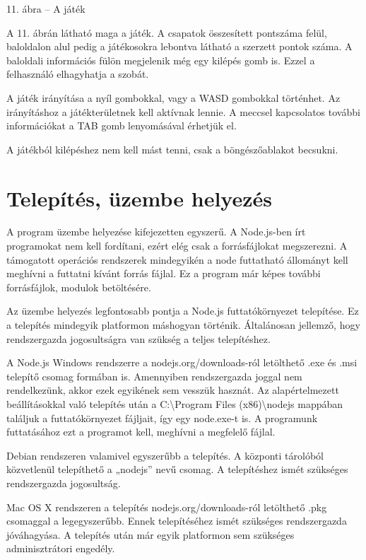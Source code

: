 \documentclass[]{article}
\begin{document}
11. ábra -- A játék

A 11. ábrán látható maga a játék. A csapatok összesített pontszáma
felül, baloldalon alul pedig a játékosokra lebontva látható a szerzett
pontok száma. A baloldali információs fülön megjelenik még egy kilépés
gomb is. Ezzel a felhasználó elhagyhatja a szobát.

A játék irányítása a nyíl gombokkal, vagy a WASD gombokkal történhet. Az
irányításhoz a játékterületnek kell aktívnak lennie. A meccsel
kapcsolatos további információkat a TAB gomb lenyomásával érhetjük el.

A játékból kilépéshez nem kell mást tenni, csak a böngészőablakot
becsukni.

\hypertarget{telepuxedtuxe9s-uxfczembe-helyezuxe9s}{%
\section{Telepítés, üzembe
helyezés}\label{telepuxedtuxe9s-uxfczembe-helyezuxe9s}}

A program üzembe helyezése kifejezetten egyszerű. A Node.js-ben írt
programokat nem kell fordítani, ezért elég csak a forrásfájlokat
megszerezni. A támogatott operációs rendszerek mindegyikén a node
futtatható állományt kell meghívni a futtatni kívánt forrás fájlal. Ez a
program már képes további forrásfájlok, modulok betöltésére.

Az üzembe helyezés legfontosabb pontja a Node.js futtatókörnyezet
telepítése. Ez a telepítés mindegyik platformon máshogyan történik.
Általánosan jellemző, hogy rendszergazda jogosultságra van szükség a
teljes telepítéshez.

A Node.js Windows rendszerre a nodejs.org/downloads-ról letölthető .exe
és .msi telepítő csomag formában is. Amennyiben rendszergazda joggal nem
rendelkezünk, akkor ezek egyikének sem vesszük hasznát. Az
alapértelmezett beállításokkal való telepítés után a
C:\textbackslash{}Program Files (x86)\textbackslash{}nodejs mappában
találjuk a futtatókörnyezet fájljait, így egy node.exe-t is. A
programunk futtatásához ezt a programot kell, meghívni a megfelelő
fájlal.

Debian rendszeren valamivel egyszerűbb a telepítés. A központi tárolóból
közvetlenül telepíthető a „nodejs'' nevű csomag. A telepítéshez ismét
szükséges rendszergazda jogosultság.

Mac OS X rendszeren a telepítés nodejs.org/downloads-ról letölthető .pkg
csomaggal a legegyszerűbb. Ennek telepítéséhez ismét szükséges
rendszergazda jóváhagyása. A telepítés után már egyik platformon sem
szükséges adminisztrátori engedély.
\end{document}
